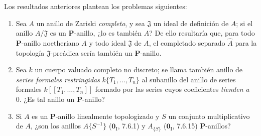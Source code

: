 \begin{remark}[7.4.8]
\label{IV.2.s7.4.8-fr}
Los resultados anteriores plantean los problemas siguientes:
\begin{enumerate}
\item[A)] Sea $A$ un anillo de Zariski \emph{completo}, y sea
$\mathfrak J$ un ideal de definición de $A$; si el anillo
$A/\mathfrak J$ es un $\boldsymbol P$-anillo, ¿lo es también $A$? De
ello resultaría que, para todo $\boldsymbol P$-anillo noetheriano $A$ y
todo ideal $\mathfrak J$ de $A$, el completado separado $\widehat A$
para la topología $\mathfrak J$-preádica sería también un
$\boldsymbol P$-anillo.
\item[B)] Sea $k$ un cuerpo valuado completo no discreto; se
llama también anillo de \emph{series formales restringidas}
$k\{T_1,\ldots,T_n\}$ al subanillo del anillo de series formales
$k[[T_1,\ldots,T_n]]$ formado por las series cuyos coeficientes
\emph{tienden a} 0. ¿Es tal anillo un $\boldsymbol P$-anillo?
\item[C)] Si $A$ es un $\boldsymbol P$-anillo linealmente
topologizado y $S$ un conjunto multiplicativo de $A$, ¿son los anillos
$A\{S^{-1}\}$ ($\mathbf{0}_{\mathrm I}$, 7.6.1) y $A_{\{S\}}$
($\mathbf{0}_{\mathrm I}$, 7.6.15) $\boldsymbol P$-anillos?
\end{enumerate}
\end{remark}
